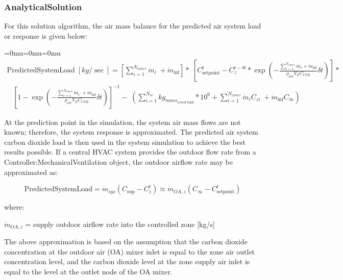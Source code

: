 \subsubsection{AnalyticalSolution}\label{analyticalsolution}

For this solution algorithm, the air mass balance for the predicted air system load or response is given below:

{\medmuskip=0mu\thinmuskip=0mu\thickmuskip=0mu\nulldelimiterspace=0pt\scriptspace=0pt
\begin{equation}
\begin{array}{l}{\mathrm{PredictedSystemLoad}}\;[kg/\sec ] = \left[ {\sum\limits_{i = 1}^{{N_{zones}}} {{{\dot m}_i}} \; + {{\dot m}_{\inf }}} \right]*\;\left[ {C_{{\mathrm{setpoint}}}^t - C_z^{t - \delta t}*\exp \left( { - \frac{{\sum\limits_{i = 1}^{{N_{zones}}} {{{\dot m}_i}}  + {{\dot m}_{\inf }}}}{{{\rho_{air}}{V_Z}{C_{CO2}}}}\delta t} \right)} \right]*\\\;\;\;{\left[ {1 - \exp \left( { - \frac{{\sum\limits_{i = 1}^{{N_{zones}}} {{{\dot m}_i}} \; + {{\dot m}_{\inf }}}}{{{\rho_{air}}{V_Z}{C_{CO2}}}}\delta t} \right)} \right]^{ - 1}} - \;\left( {\sum\limits_{i = 1}^{{N_{sl}}} {k{g_{mas{s_{sched\;load}}}}*{{10}^6}}  + \sum\limits_{i = 1}^{{N_{zones}}} {{{\dot m}_i}} {C_{zi}}\; + {{\dot m}_{\inf }}{C_\infty }} \right)\end{array}
\end{equation}}

At the prediction point in the simulation, the system air mass flows are not known; therefore, the system response is approximated. The predicted air system carbon dioxide load is then used in the system simulation to achieve the best results possible. If a central HVAC system provides the outdoor flow rate from a Controller:MechanicalVentilation object, the outdoor airflow rate may be approximated as:

\begin{equation}
{\mathrm{PredictedSystemLoad}} = {\dot m_{sys}}\left( {{C_{\sup }} - C_z^t} \right) \approx {\dot m_{OA,z}}\left( {{C_\infty } - C_{{\mathrm{setpoint}}}^t} \right)
\end{equation}

where:

\({\dot m_{OA,z}}\) = supply outdoor airflow rate into the controlled zone {[}kg/s{]}

The above approximation is based on the assumption that the carbon dioxide concentration at the outdoor air (OA) mixer inlet is equal to the zone air outlet concentration level, and the carbon dioxide level at the zone supply air inlet is equal to the level at the outlet node of the OA mixer.

